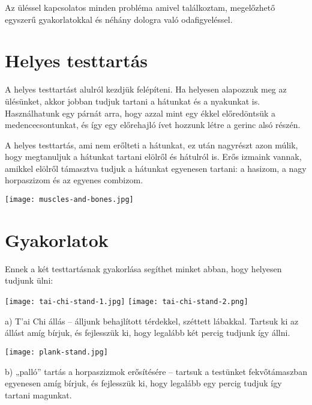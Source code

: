 \documentclass[12pt,oneside,landscape,final]{memoir}
\begin{document}
Az üléssel kapcsolatos minden probléma amivel találkoztam, megelőzhető egyszerű
gyakorlatokkal és néhány dologra való odafigyeléssel.

\section{Helyes testtartás}

A helyes testtartást alulról kezdjük felépíteni. Ha helyesen alapozzuk meg az
ülésünket, akkor jobban tudjuk tartani a hátunkat és a nyakunkat is.
Használhatunk egy párnát arra, hogy azzal mint egy ékkel előredöntsük a
medencecsontunkat, és így egy előrehajló ívet hozzunk létre a gerinc alsó
részén.

A helyes testtartás, ami nem erőlteti a hátunkat, ez után nagyrészt azon múlik,
hogy megtanuljuk a hátunkat tartani elölről és hátulról is. Erős izmaink vannak,
amikkel elölről támasztva tudjuk a hátunkat egyenesen tartani: a hasizom, a nagy
horpaszizom és az egyenes combizom.

{\centering\par
\texttt{[image: muscles-and-bones.jpg]}
\par}

\clearpage

\section{Gyakorlatok}

Ennek a két testtartásnak gyakorlása segíthet minket abban, hogy helyesen
tudjunk ülni:

{\centering\par
\texttt{[image: tai-chi-stand-1.jpg]}%
\hspace*{5mm}%
\texttt{[image: tai-chi-stand-2.png]}
\par}

a) T’ai Chi állás – álljunk behajlított térdekkel, széttett lábakkal. Tartsuk ki
az állást amíg bírjuk, és fejlesszük ki, hogy legalább két percig tudjunk így
állni.

{\centering\par
\texttt{[image: plank-stand.jpg]}%
\par}

b) „palló” tartás a horpaszizmok erősítésére – tartsuk a testünket
fekvőtámaszban egyenesen amíg bírjuk, és fejlesszük ki, hogy legalább egy percig
tudjuk így tartani magunkat.
\end{document}
